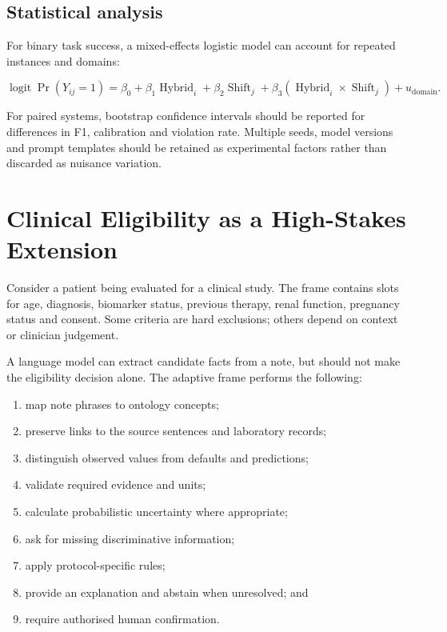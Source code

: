 \documentclass[11pt,a4paper]{article}
\begin{document}
\subsection{Statistical analysis}

For binary task success, a mixed-effects logistic model can account for repeated
instances and domains:

\begin{equation}
\operatorname{logit}\Pr(Y_{ij}=1)=
\beta_0+\beta_1\operatorname{Hybrid}_i+
\beta_2\operatorname{Shift}_j+
\beta_3(\operatorname{Hybrid}_i\!\times\!\operatorname{Shift}_j)
+u_{\mathrm{domain}}.
\end{equation}

For paired systems, bootstrap confidence intervals should be reported for
differences in F1, calibration and violation rate. Multiple seeds, model versions
and prompt templates should be retained as experimental factors rather than
discarded as nuisance variation.

\section{Clinical Eligibility as a High-Stakes Extension}

Consider a patient being evaluated for a clinical study. The frame contains
slots for age, diagnosis, biomarker status, previous therapy, renal function,
pregnancy status and consent. Some criteria are hard exclusions; others depend
on context or clinician judgement.

A language model can extract candidate facts from a note, but should not make
the eligibility decision alone. The adaptive frame performs the following:

\begin{enumerate}
  \item map note phrases to ontology concepts;
  \item preserve links to the source sentences and laboratory records;
  \item distinguish observed values from defaults and predictions;
  \item validate required evidence and units;
  \item calculate probabilistic uncertainty where appropriate;
  \item ask for missing discriminative information;
  \item apply protocol-specific rules;
  \item provide an explanation and abstain when unresolved; and
  \item require authorised human confirmation.
\end{enumerate}
\end{document}
